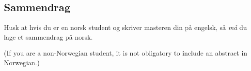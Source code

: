 
\begin{otherlanguage}{norsk}

\section*{Sammendrag}

Husk at hvis du er en norsk student og skriver masteren din på engelsk, så {\em må\/} du lage et sammendrag på norsk.

(If you are a non-Norwegian student, it is not obligatory to include an abstract in Norwegian.)

\end{otherlanguage}
